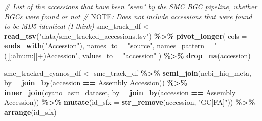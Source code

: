 \documentclass[
]{article}
\newenvironment{Shaded}{\begin{snugshade}}{\end{snugshade}}
\newcommand{\AlertTok}[1]{\textcolor[rgb]{0.94,0.16,0.16}{#1}}
\newcommand{\AttributeTok}[1]{\textcolor[rgb]{0.13,0.29,0.53}{#1}}
\newcommand{\CommentTok}[1]{\textcolor[rgb]{0.56,0.35,0.01}{\textit{#1}}}
\newcommand{\FunctionTok}[1]{\textcolor[rgb]{0.13,0.29,0.53}{\textbf{#1}}}
\newcommand{\NormalTok}[1]{#1}
\newcommand{\OtherTok}[1]{\textcolor[rgb]{0.56,0.35,0.01}{#1}}
\newcommand{\SpecialCharTok}[1]{\textcolor[rgb]{0.81,0.36,0.00}{\textbf{#1}}}
\newcommand{\StringTok}[1]{\textcolor[rgb]{0.31,0.60,0.02}{#1}}
\begin{document}
\begin{Shaded}
\begin{Highlighting}[]
\CommentTok{\# List of the accessions that have been "seen" by the SMC BGC pipeline, whether BGCs were found or not}
\CommentTok{\# }\AlertTok{NOTE}\CommentTok{: Does not include accessions that were found to be MD5{-}identical (I think)}
\NormalTok{smc\_track\_df }\OtherTok{\textless{}{-}} \FunctionTok{read\_tsv}\NormalTok{(}\StringTok{"data/smc\_tracked\_accessions.tsv"}\NormalTok{) }\SpecialCharTok{\%\textgreater{}\%}
  \FunctionTok{pivot\_longer}\NormalTok{(}
    \AttributeTok{cols =} \FunctionTok{ends\_with}\NormalTok{(}\StringTok{"Accession"}\NormalTok{),}
    \AttributeTok{names\_to =} \StringTok{"source"}\NormalTok{,}
    \AttributeTok{names\_pattern =} \StringTok{"([[:alnum:]]+)Accession"}\NormalTok{,}
    \AttributeTok{values\_to =} \StringTok{"accession"}
\NormalTok{  ) }\SpecialCharTok{\%\textgreater{}\%}
  \FunctionTok{drop\_na}\NormalTok{(accession)}

\NormalTok{smc\_tracked\_cyanos\_df }\OtherTok{\textless{}{-}}\NormalTok{ smc\_track\_df }\SpecialCharTok{\%\textgreater{}\%} 
  \FunctionTok{semi\_join}\NormalTok{(ncbi\_hiq\_meta, }\AttributeTok{by =} \FunctionTok{join\_by}\NormalTok{(accession }\SpecialCharTok{==} \StringTok{\textasciigrave{}}\AttributeTok{Assembly Accession}\StringTok{\textasciigrave{}}\NormalTok{)) }\SpecialCharTok{\%\textgreater{}\%}
  \FunctionTok{inner\_join}\NormalTok{(cyano\_asm\_dataset, }\AttributeTok{by =} \FunctionTok{join\_by}\NormalTok{(accession }\SpecialCharTok{==} \StringTok{\textasciigrave{}}\AttributeTok{Assembly Accession}\StringTok{\textasciigrave{}}\NormalTok{)) }\SpecialCharTok{\%\textgreater{}\%} 
  \FunctionTok{mutate}\NormalTok{(}\AttributeTok{id\_sfx =} \FunctionTok{str\_remove}\NormalTok{(accession, }\StringTok{"GC[FA]"}\NormalTok{)) }\SpecialCharTok{\%\textgreater{}\%} 
  \FunctionTok{arrange}\NormalTok{(id\_sfx)}


\end{Highlighting}
\end{Shaded}
\end{document}
